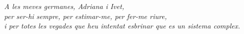 \vspace*{8 cm}
\thispagestyle{empty}

\begin{flushright}
    \sffamily\Large
    \textit{
    A les meves germanes, Adriana i Ivet,\\
    per ser-hi sempre, per estimar-me, per fer-me riure, \\
    i per totes les vegades que heu intentat esbrinar que es un sistema complex.\\
    }
\end{flushright}